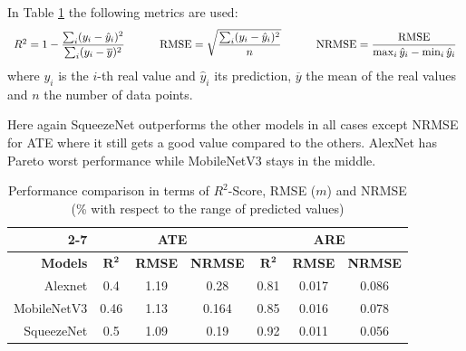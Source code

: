 \noindent
In Table \ref{tab:r2score} the following metrics are used:
\[
\begin{array}{r@{\hspace{1.1cm}}r@{\hspace{1.1cm}}r}
    R^2 = 1-\displaystyle\frac{\sum_i(y_i-\hat{y}_i)^2}{\sum_i(y_i-\overline{y})^2} &
    \text{RMSE} = \displaystyle\sqrt{\frac{\sum_i(y_i-\hat{y}_i)^2}{n}} &
    \text{NRMSE} = \displaystyle\frac{\text{RMSE}}{\max_i \hat{y}_i - \min_i \hat{y}_i}
\end{array}
\]
where $y_i$ is the $i$-th real value and $\hat{y}_i$ its prediction, $\overline{y}$ the mean of the real values and $n$ the number of data points.

Here again SqueezeNet outperforms the other models in all cases except NRMSE for ATE where it still gets a good value compared to the others. AlexNet has Pareto worst performance while MobileNetV3 stays in the middle.

\begin{table}[H]\centering
\begin{tabular}{r|ccc|ccc|}
\cline{2-7}
\multicolumn{1}{l|}{}                 & \multicolumn{3}{c|}{\textbf{ATE}}                                                                           & \multicolumn{3}{c|}{\textbf{ARE}}                                                                                                                           \\ \hline
\multicolumn{1}{|r|}{\textbf{Models}} & \multicolumn{1}{c|}{$\bm{R^2}$} & \multicolumn{1}{c|}{\textbf{RMSE}} & \multicolumn{1}{c|}{\textbf{NRMSE}} & \multicolumn{1}{c|}{$\bm{R^2}$} & \multicolumn{1}{c|}{\textbf{RMSE}} & \multicolumn{1}{c|}{\textbf{NRMSE}} \\ \hline
\multicolumn{1}{|r|}{Alexnet}         & \multicolumn{1}{c|}{0.4}            & \multicolumn{1}{c|}{1.19}              &        0.28                          & \multicolumn{1}{c|}{0.81}            & \multicolumn{1}{c|}{0.017}              &                 0.086                                        \\ \hline
\multicolumn{1}{|r|}{MobileNetV3}       & \multicolumn{1}{c|}{0.46}            & \multicolumn{1}{c|}{1.13}              & \color{red}0.164                           & \multicolumn{1}{c|}{0.85}            & \multicolumn{1}{c|}{0.016}              &       0.078                                                      \\ \hline
\multicolumn{1}{|r|}{SqueezeNet}      & \multicolumn{1}{c|}{\color{red}0.5}            & \multicolumn{1}{c|}{\color{red}1.09}              &          0.19                       & \multicolumn{1}{c|}{\color{red}0.92}            & \multicolumn{1}{c|}{\color{red}0.011}              &  \color{red}0.056                                                     \\ \hline
\end{tabular}
\captionsetup{width=0.93\linewidth}
\caption{Performance comparison in terms of $R^2$-Score, RMSE ($m$) and NRMSE (\% with respect to the range of predicted values)\label{tab:r2score}}
\end{table}

